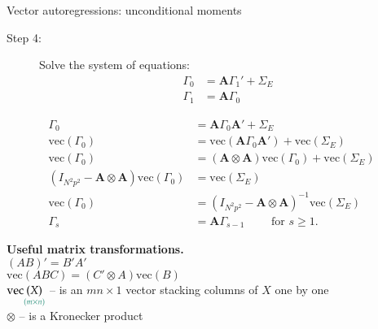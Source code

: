 \documentclass[notes,blackandwhite,mathsans,usenames,dvipsnames]{beamer}
\begin{document}
\begin{frame}{Vector autoregressions: unconditional moments }
\small
\begin{description}
\item[Step 4:] {\color{mcxs1}Solve} {\color{mcxs2}the system of equations}:
\begin{align*}
\Gamma_0 &= \mathbf{A}\Gamma_1' + \Sigma_E\\
\Gamma_1 &= \mathbf{A}\Gamma_0
\end{align*}
\end{description}
\begin{align*}
\Gamma_0 &= \mathbf{A}\Gamma_0\mathbf{A}' + \Sigma_E\\
\text{vec}(\Gamma_0) &= \text{vec}(\mathbf{A}\Gamma_0\mathbf{A}') + \text{vec}(\Sigma_E)\\
\text{vec}(\Gamma_0) &= (\mathbf{A}\otimes\mathbf{A})\text{vec}(\Gamma_0) + \text{vec}(\Sigma_E)\\
(I_{N^2p^2} - \mathbf{A}\otimes\mathbf{A})\text{vec}(\Gamma_0) &= \text{vec}(\Sigma_E)\\
\text{vec}(\Gamma_0) &= (I_{N^2p^2} - \mathbf{A}\otimes\mathbf{A})^{-1}\text{vec}(\Sigma_E)\\[1ex]
\Gamma_s &= \mathbf{A}\Gamma_{s-1} \qquad\text{ for }s\geq1.
\end{align*}

\textbf{Useful matrix transformations.}\\
$(AB)' = B'A' $\\
$\text{vec}(ABC) = (C'\otimes A)\text{vec}(B)$\\
$\text{vec}\underset{\color{mcxs2}(m\times n)}{(X)}$ {\color{mcxs2}-- is an} $mn\times1$ {\color{mcxs2}vector stacking columns of} $X$ {\color{mcxs2}one by one}\\
$\otimes$ {\color{mcxs2}-- is a Kronecker product}

\end{frame}
\end{document}
